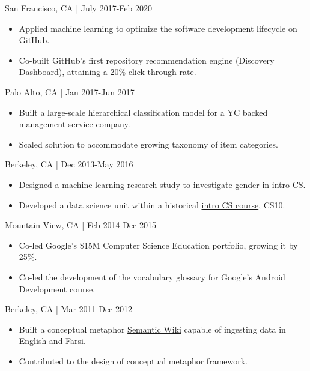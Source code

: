 \documentclass[11pt,article,oneside]{memoir}
\begin{document}
 \hfill San Francisco, CA | July 2017-Feb 2020
\begin{itemize}[nolistsep]
\item[-]Applied machine learning to optimize the software development lifecycle on GitHub.
\item[-]Co-built GitHub's first repository recommendation engine (Discovery Dashboard), attaining a 20\% click-through rate.
\end{itemize} 

 \hfill Palo Alto, CA | Jan 2017-Jun 2017
\begin{itemize}[nolistsep]
\item[-]Built a large-scale hierarchical classification model for a YC backed management service company.
\item[-]Scaled solution to accommodate growing taxonomy of item categories.
\end{itemize} 

 \hfill Berkeley, CA | Dec 2013-May 2016
\begin{itemize}[noitemsep,nolistsep]
\item[-] Designed a machine learning research study to investigate gender in intro CS.
\item[-] Developed a data science unit within a historical \href{http://www.whitehouse.gov/the-press-office/2014/12/08/fact-sheet-new-commitments-support-computer-science-education}{intro CS course}, CS10.
\end{itemize}

 \hfill Mountain View, CA | Feb 2014-Dec 2015
\begin{itemize}[nolistsep]
\item[-]Co-led Google's \$15M Computer Science Education portfolio, growing it by 25\%.
\item[-]Co-led the development of the vocabulary glossary for Google's Android Development course.
\end{itemize} 

 \hfill Berkeley, CA | Mar 2011-Dec 2012
\begin{itemize}[nolistsep]
\item[-] Built a conceptual metaphor \href{http://metaphor.icsi.berkeley.edu}{Semantic Wiki} capable of ingesting data in English and Farsi.
\item[-] Contributed to the design of conceptual metaphor framework.
\end{itemize} 
\end{document}

